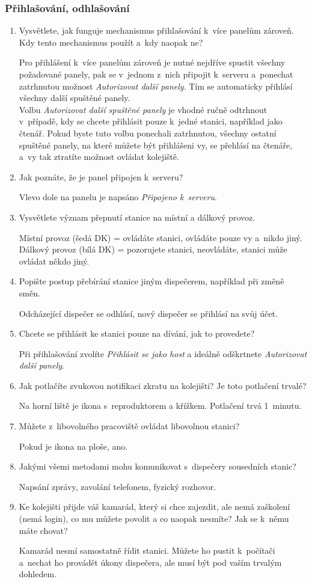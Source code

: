 \documentclass[12pt,a4paper]{article}
\def\solution#1{\ifsolution \par{\color{gray}#1}\fi}
\begin{document}
\subsubsection*{Přihlašování, odhlašování}
\begin{enumerate}[leftmargin=*]

\item Vysvětlete, jak funguje mechanismus přihlašování k~více panelům zároveň.
Kdy tento mechanismus použít a~kdy naopak ne?
\solution{Pro přihlášení k~více panelům zároveň je nutné nejdříve spustit
všechny požadované panely, pak se v~jednom z~nich připojit k~serveru a~ponechat
zatrhnutou možnost \textit{Autorizovat další panely}. Tím se automaticky
přihlásí všechny další spuštěné panely. \\ Volbu \textit{Autorizovat další
spuštěné panely} je vhodné ručně odtrhnout v~případě, kdy se chcete přihlásit
pouze k~jedné stanici, například jako čtenář. Pokud byste tuto volbu ponechali
zatrhnutou, všechny ostatní spuštěné panely, na které můžete být přihlášeni vy,
se přehlásí na čtenáře, a~vy tak ztratíte možnost ovládat kolejiště.}

\item Jak poznáte, že je panel připojen k~serveru?
\solution{Vlevo dole na panelu je napsáno \textit{Připojeno k~serveru}}.

\item Vysvětlete význam přepnutí stanice na místní a dálkový provoz.
\solution{Místní provoz (šedá DK) = ovládáte stanici, ovládáte pouze vy a~nikdo
jiný. Dálkový provoz (bílá DK) = pozorujete stanici, neovládáte, stanici může
ovládat někdo jiný.}

\item Popište postup přebírání stanice jiným dispečerem, například při změně
směn.
\solution{Odcházející dispečer se odhlásí, nový dispečer se přihlásí na svůj
účet.}

\item Chcete se přihlásit ke stanici pouze na dívání, jak to provedete?
\solution{Při přihlašování zvolíte \textit{Přihlásit se jako host} a ideálně
odškrtnete \textit{Autorizovat další panely}.}

\item Jak potlačíte zvukovou notifikaci zkratu na kolejišti? Je toto
potlačení trvalé?
\solution{Na horní liště je ikona s~reproduktorem a křížkem. Potlačení trvá
1~minutu.}

\item Můžete z~libovolného pracoviště ovládat libovolnou stanici?
\solution{Pokud je ikona na ploše, ano.}

\item Jakými všemi metodami mohu komunikovat s~dispečery sousedních stanic?
\solution{Napsání zprávy, zavolání telefonem, fyzický rozhovor.}

\item Ke kolejišti přijde váš kamarád, který si chce zajezdit, ale nemá
zaškolení (nemá login), co mu můžete povolit a co naopak nesmíte? Jak se k~němu
máte chovat?
\solution{Kamarád nesmí samostatně řídit stanici. Můžete ho pustit k~počítači
a~nechat ho provádět úkony dispečera, ale musí být pod vaším trvalým dohledem.}

\end{enumerate}
\end{document}
